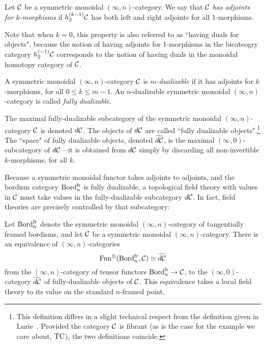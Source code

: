 \documentclass{amsart}
\begin{document}
\begin{appdefinition}
	Let $\mathcal C$ be a symmetric monoidal $(\infty,n)$-category. We say that $\mathcal C$ {\em has adjoints for $k$-morphisms} if $h^{(k-1)}_2 \mathcal C$ has both left and right adjoints for all 1-morphisms. 
\end{appdefinition}

\noindent Note that when $k=0$, this property is also referred to as ``having duals for objects", because the notion of having adjoints for 1-morphisms in the bicateogry category $h^{(-1)}_2 \mathcal C$ corresponds to the notion of having duals in the monoidal homotopy category of $\mathcal C$.

\begin{appdefinition}
A symmetric monoidal $(\infty,n)$-category $\mathcal C$ is \emph{$m$-dualizable} if it has adjoints for $k$-morphisms, for all $0 \leq k \leq m-1$.  An $n$-dualizable symmetric monoidal $(\infty,n)$-category is called \emph{fully dualizable}.
\end{appdefinition}

\noindent The maximal fully-dualizable subcategory of the symmetric monoidal $(\infty,n)$-category $\mathcal C$ is denoted $d\mathcal C$. The objects of $d\mathcal C$ are called ``fully dualizable objects".\footnote{This definition differs in a slight technical respect from the definition given in Lurie~\cite{lurie-ch}.  Provided the category $\mathcal C$ is fibrant (as is the case for the example we care about, $\mathrm{TC}$), the two definitions coincide.}  The ``space" of fully dualizable objects, denoted $\widetilde{d\mathcal C}$, is the maximal $(\infty,0)$-subcategory of $d\mathcal C$---it is obtained from $d\mathcal C$ simply by discarding all non-invertible $k$-morphisms, for all $k$. 

Because a symmetric monoidal functor takes adjoints to adjoints, and the bordism category $\mathrm{Bord}^\mathrm{fr}_n$ is fully dualizable, a topological field theory with values in $\mathcal C$ must take values in the fully-dualizable subcategory $d\mathcal C$.  In fact, field theories are precisely controlled by that subcategory:

\begin{apptheorem}
	Let $\mathrm{Bord}^\mathrm{fr}_n$ denote the symmetric monoidal $(\infty,n)$-category of tangentially framed bordisms, and let $\mathcal C$ be a symmetric monoidal $(\infty,n)$-category.  There is an equivalence of $(\infty,n)$-categories
	\begin{equation*}
		\operatorname{Fun}^\otimes(\mathrm{Bord}^\mathrm{fr}_n, \mathcal C) \simeq \widetilde{d\mathcal C}
	\end{equation*} 
from the $(\infty,n)$-category of tensor functors $\mathrm{Bord}^\mathrm{fr}_n \rightarrow \mathcal C$, to the $(\infty,0)$-category $\widetilde{d\mathcal C}$ of fully-dualizable objects of $\mathcal C$.  This equivalence takes a local field theory to its value on the standard $n$-framed point.	
\end{apptheorem}
\end{document}
